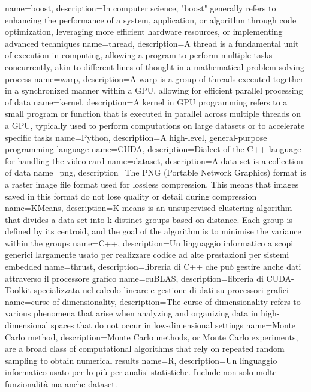 {
    name=boost,
    description={In computer science, "boost" generally refers to enhancing the performance of a system, application, or algorithm through code optimization, leveraging more efficient hardware resources, or implementing advanced techniques}
}
{
    name=thread,
    description={A thread is a fundamental unit of execution in computing, allowing a program to perform multiple tasks concurrently, akin to different lines of thought in a mathematical problem-solving process}
}
{
    name=warp,
    description={A warp is a group of threads executed together in a synchronized manner within a GPU, allowing for efficient parallel processing of data}
}
{
    name=kernel,
    description={A kernel in GPU programming refers to a small program or function that is executed in parallel across multiple threads on a GPU, typically used to perform computations on large datasets or to accelerate specific tasks}
}
{
    name=Python,
    description={A high-level, general-purpose programming language}
}
{
    name=CUDA,
    description={Dialect of the C++ language for handling the video card}
}
{
    name=dataset,
    description={A data set is a collection of data}
}
{
    name=png,
    description={The PNG (Portable Network Graphics) format is a raster image file format used for lossless compression. This means that images saved in this format do not lose quality or detail during compression}
}
{
    name=KMeans,
    description={K-means is an unsupervised clustering algorithm that divides a data set into k distinct groups based on distance. Each group is defined by its centroid, and the goal of the algorithm is to minimise the variance within the groups}
}
{
    name=C++,
    description={Un linguaggio informatico a scopi generici largamente usato per realizzare codice ad alte prestazioni per sistemi embedded}
}
{
    name=thrust,
    description={libreria di C++ che può gestire anche dati attraverso il processore grafico}
}
{
    name=cuBLAS,
    description={libreria di CUDA-Toolkit specializzata nel calcolo lineare e gestione di dati su processori grafici}
}
{
name=curse of dimensionality,
description={The curse of dimensionality refers to various phenomena that arise when analyzing and organizing data in high-dimensional spaces that do not occur in low-dimensional settings}
}
{
	name=Monte Carlo method,
	description={Monte Carlo methods, or Monte Carlo experiments, are a broad class of computational algorithms that rely on repeated random sampling to obtain numerical results}
}
{
name=R,
description={Un linguaggio informatico usato per lo più per analisi statistiche. Include non solo molte funzionalità ma anche dataset.}
}

